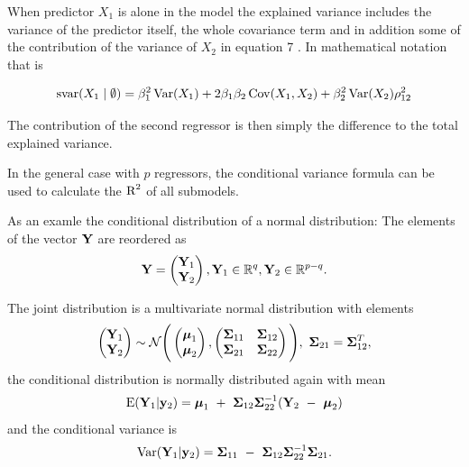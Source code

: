 \documentclass[11pt,a4paper,twoside]{book}\usepackage[]{graphicx}\usepackage[]{color}
\begin{document}
 When predictor $X_{1}$ is alone in the model the explained variance includes the variance of the predictor itself, the whole covariance term and in addition some of the contribution of the variance of $X_{2}$ in equation 7 . In mathematical notation that is
 
      \begin{align} 
        \text{svar}({X_{1}} \mid \emptyset ) = \beta_{1}^2 \operatorname{Var}(X_{1}) + 2  \beta_{1}  \beta_{2} \operatorname{Cov}(X_{1}, X_{2}) + \beta_{2}^2 \operatorname{Var}(X_{2}) \rho_{12}^2 \label{eq:7} 
   \end{align}
   
The contribution of the second regressor is then simply the difference to the total explained variance. 

In the general case with $p$ regressors, the conditional variance formula can be used to calculate the $\text{R}^2$ of all submodels.  

As an examle the conditional distribution of a normal distribution:
The elements of the vector ${\mathbf{Y}}$ are reordered as
\begin{align*}
\mathbf{Y} = \begin{pmatrix}
\mathbf{Y}_{1} \\ 
\mathbf{Y}_{2} \end{pmatrix}, \mathbf{Y}_{1} \in {\mathbb{R}}^q, \mathbf{Y}_{2} \in {\mathbb{R}}^{p-q} .
\end{align*}

The joint distribution is a multivariate normal distribution with elements
\begin{align*}
\begin{pmatrix}
\mathbf{Y}_{1} \\ 
\mathbf{Y}_{2} \end{pmatrix} \sim \mathcal{N}
\Bigg(\begin{pmatrix}
\boldsymbol{\mu}_{1} \\ 
\boldsymbol{\mu}_{2} 
\end{pmatrix},
\begin{pmatrix}
{\boldsymbol{\Sigma}}{}_{11} & {\boldsymbol{\Sigma}}{}_{12} \\
{\boldsymbol{\Sigma}}{}_{21} & {\boldsymbol{\Sigma}}{}_{22} \\
\end{pmatrix}\Bigg),
\ {\boldsymbol{\Sigma}}{}_{21} = {\boldsymbol{\Sigma}}{}_{12}^{T},
\end{align*}
the conditional distribution is normally distributed again with mean 
\begin{align*}
\E (\mathbf{Y}_{1} | \mathbf{y}_{2} ) = \boldsymbol{\mu}_{1}\ +\ \bSigma_{12} \bSigma_{22}^{-1}(\mathbf{Y}_{2}\ -\ \boldsymbol{\mu}_{2})
\end{align*}
and the conditional variance is
\begin{align*}
\operatorname{Var} ( \mathbf{Y}_{1} | \mathbf{y}_{2} ) = {\boldsymbol{\Sigma}}{}_{11}\ -\ {\boldsymbol{\Sigma}}{}_{12} {\boldsymbol{\Sigma}}{}_{22}^{-1}{\boldsymbol{\Sigma}}{}_{21} \text{.}
\end{align*}
\end{document}
